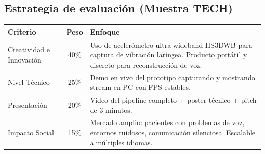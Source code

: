 \documentclass[10pt,a4paper]{article}
\begin{document}
\subsection*{Estrategia de evaluación (Muestra TECH)}

\begin{tabularx}{\textwidth}{l c X}
\toprule
\textbf{Criterio} & \textbf{Peso} & \textbf{Enfoque} \\
\midrule
Creatividad e Innovación & 40\% & Uso de acelerómetro ultra-wideband IIS3DWB para captura de vibración laríngea. Producto portátil y discreto para reconstrucción de voz.\\
Nivel Técnico & 25\% & Demo en vivo del prototipo capturando y mostrando stream en PC con FPS estables.\\
Presentación & 20\% & Video del pipeline completo + poster técnico + pitch de 3 minutos.\\
Impacto Social & 15\% & Mercado amplio: pacientes con problemas de voz, entornos ruidosos, comunicación silenciosa. Escalable a múltiples idiomas.\\
\bottomrule
\end{tabularx}
\end{document}
